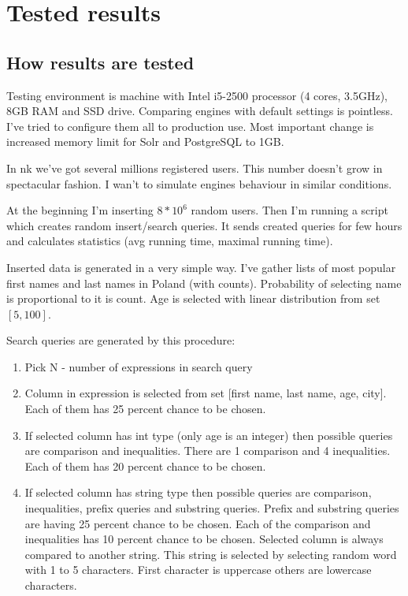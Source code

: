 \documentclass[10pt,a4paper]{article}
\begin{document}
\section{Tested results}

\subsection{How results are tested}

Testing environment is machine with Intel i5-2500 processor (4 cores, 3.5GHz), 8GB RAM and SSD drive. Comparing engines with default settings is pointless. I've tried to configure them all to production use. Most important change is increased memory limit for Solr and PostgreSQL to 1GB.

In nk we've got several millions registered users. This number doesn't grow in spectacular fashion. I wan't to simulate engines behaviour in similar conditions. 

At the beginning I'm inserting $8 * 10^6$ random users. Then I'm running a script which creates random insert/search queries. It sends created queries for few hours and calculates statistics (avg running time, maximal running time).

Inserted data is generated in a very simple way. I've gather lists of most popular first names and last names in Poland (with counts). Probability of selecting name is proportional to it is count. Age is selected with linear distribution from set $[5, 100]$.

Search queries are generated by this procedure:
\begin{enumerate}
\item Pick N - number of expressions in search query
\item Column in expression is selected from set [first name, last name, age, city]. Each of them has 25 percent chance to be chosen.
\item If selected column has int type (only age is an integer) then possible queries are comparison and inequalities. There are 1 comparison and 4 inequalities. Each of them has 20 percent chance to be chosen.
\item If selected column has string type then possible queries are comparison, inequalities, prefix queries and substring queries. Prefix and substring queries are having 25 percent chance to be chosen. Each of the comparison and inequalities has 10 percent chance to be chosen. Selected column is always compared to another string. This string is selected by selecting random word with 1 to 5 characters. First character is uppercase others are lowercase characters. 
\end{enumerate}
\end{document}
